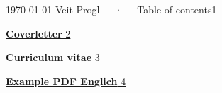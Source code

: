 \documentclass[ngerman, 11pt, a4paper]{awesome-cv}
\begin{document}
\makecvheader[R]

\makecvfooter
  {\today}
  {Veit Progl~~~·~~~Table of contents}1
  {}

\makelettertitle

\begin{cvletter}


\hyperlink{page.2}{
\textbf{Coverletter}
\hfill
2 \\
}

\hyperlink{page.3}{
\textbf{Curriculum vitae}
\hfill
3 \\
}

%

\hyperlink{page.4}{
\textbf{Example PDF Englich}
\hfill
4 \\
}


\end{cvletter}




%
%




\end{document}
